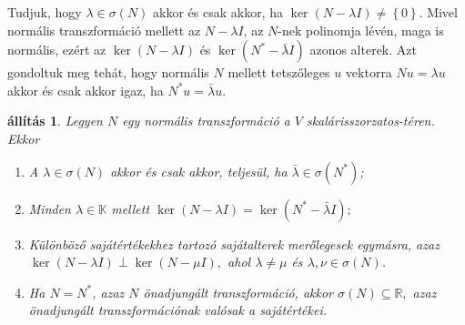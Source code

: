 \documentclass[9pt, a4paper, showtrims]{memoir}
\theoremstyle{plain}
\newtheorem{proposition}{állítás}[chapter]
\theoremstyle{remark}
\theoremstyle{definition}
\begin{document}
Tudjuk, hogy $\lambda\in\sigma(N)$ akkor és csak akkor, ha $\ker(N-\lambda I)\neq \left\{ 0 \right\}$.
Mivel normális transzformáció mellett az $N-\lambda I$, 
az $N$-nek polinomja lévén,
maga is normális,
ezért az $\ker (N-\lambda I)$ és $\ker (N^\ast-\bar{\lambda}I)$ azonos alterek.
Azt gondoltuk meg tehát, hogy normális $N$ mellett
tetszőleges $u$ vektorra $Nu=\lambda u$ akkor és csak akkor igaz, ha $N^\ast u=\bar{\lambda}u$.
\begin{proposition}\label{pr:normtul}
    Legyen $N$ egy normális transzformáció a $V$ skalárisszorzatos-téren.
    Ekkor
    \begin{enumerate}
        \item 
            A $\lambda\in\sigma\left( N \right)$ akkor és csak akkor, 
            teljesül, ha
            $\bar{\lambda}\in\sigma\left( N^\ast \right)$;
        \item
            Minden $\lambda\in\mathbb{K}$ mellett 
            \begin{math}
                \ker (N-\lambda I)=\ker (N^\ast-\bar{\lambda}I);
            \end{math}
        \item 
            Különböző sajátértékekhez tartozó sajátalterek merőlegesek egymásra, azaz
            \begin{math}
                \ker \left( N-\lambda I \right)\perp\ker\left( N-\mu I \right),
            \end{math}
            ahol $\lambda\neq \mu$ és $\lambda,\nu\in\sigma\left( N \right)$.
        \item Ha $N=N^\ast$, azaz $N$ önadjungált transzformáció, akkor
            \begin{math}
                \sigma\left( N \right)\subseteq \mathbb{R},
            \end{math}
            azaz önadjungált transzformációnak valósak a sajátértékei.
            \qedhere
    \end{enumerate}
\end{proposition}
\end{document}
